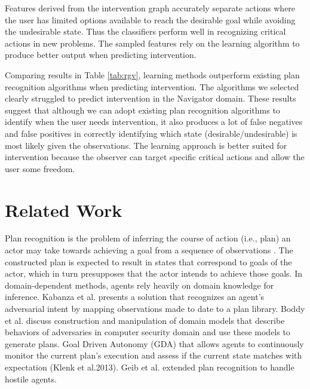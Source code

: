 \documentclass[letterpaper]{article}
\theoremstyle{plain}
\begin{document}
Features derived from the intervention graph accurately separate actions where the user has limited options available to reach the desirable goal while avoiding the undesirable state. Thus the classifiers perform well in recognizing critical actions in new problems. The sampled features rely on the learning algorithm to produce better output when predicting intervention. 

Comparing results in Table \ref{tab:rgv}, learning methods outperform existing plan recognition algorithms when predicting intervention. The algorithms we selected clearly struggled to predict intervention in the Navigator domain. 
These results suggest that although we can adopt existing plan recognition algorithms to identify when the user needs intervention, it also produces a lot of false negatives and false positives in correctly identifying which state (desirable/undesirable) is most likely given the observations. The learning approach is better suited for intervention because the observer can target specific critical actions and allow the user some freedom.

\section{Related Work}
\label{sec:relatedwork}
Plan recognition is the problem of inferring the course of action (i.e., plan) an actor may take towards achieving a goal from a sequence of observations \cite{schmidt1978plan,kautz1986generalized}. The constructed plan is expected to result in states that correspond to goals of the actor, which in turn presupposes that the actor intends to achieve those goals. 
In domain-dependent methods, agents rely heavily on domain knowledge for inference. Kabanza et al.   presents a solution that recognizes an agent’s adversarial intent by mapping observations made to date to a plan library. Boddy et al.  discuss construction and manipulation of domain models that describe behaviors of adversaries in computer security domain and use these models to generate plans. Goal Driven Autonomy (GDA) that allows agents to continuously monitor the current plan’s execution and assess if the current state matches with expectation (Klenk et al.2013)\nocite{aha2013gda}. Geib et al.  extended plan recognition to handle hostile agents.
\end{document}
